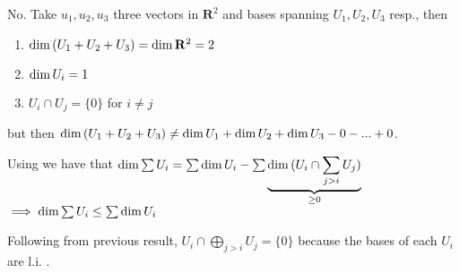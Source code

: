 \exo{} No. Take $u_1,u_2,u_3$ three vectors in $\mathbf{R}^2$ and bases spanning $U_1, U_2, U_3$ resp., then 
\begin{enumerate}
  \item $\operatorname{dim}{(U_1+U_2+U_3)} = \operatorname{dim}{\mathbf{R}^2} = 2$
  \item $\operatorname{dim}{U_i} = 1$
  \item $U_i\cap U_j = \{0\}$ for $i\neq j$ 
\end{enumerate} 
but then $\operatorname{dim}{(U_1+U_2+U_3)} \neq \operatorname{dim}{U_1} + \operatorname{dim}{U_2} + \operatorname{dim}{U_3} - 0 - ... + 0$.



\exo{}  Using  we have that $\operatorname{dim}{  \sum U_i  } = \sum \operatorname{dim}{U_i} - \sum \underbrace{\operatorname{dim}{ (U_i \cap \sum_{j>i} U_j) }}_{\ge 0}  $
$\implies  \operatorname{dim}{  \sum U_i  } \leq \sum \operatorname{dim}{U_i}  $


\exo{} Following from previous result, $U_i \cap \bigoplus\limits_{j>i} U_j = \{0\}$ because the bases of each $U_i$ are l.i. .

